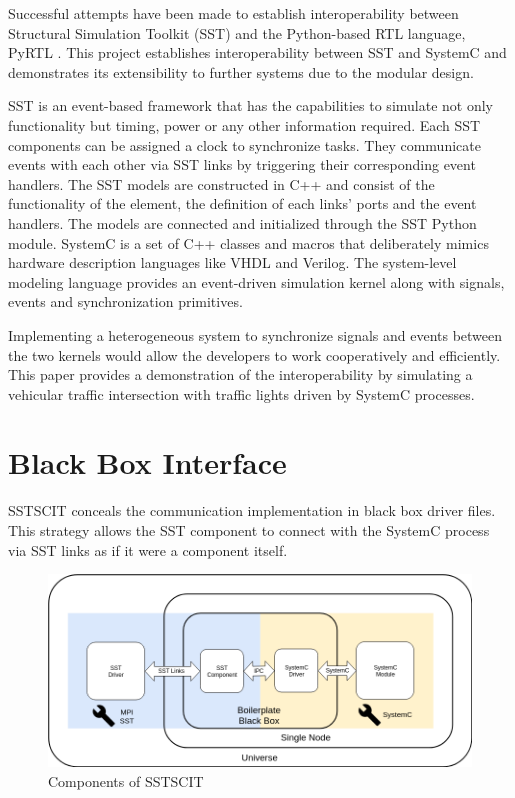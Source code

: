 \documentclass{article}
\begin{document}
  Successful attempts have been made to establish interoperability between Structural Simulation
  Toolkit (SST) and the Python-based RTL language, PyRTL \cite{pyrtl-sst}. This project establishes
  interoperability between SST and SystemC and demonstrates its extensibility to further systems due
  to the modular design.

  SST is an event-based framework that has the capabilities to simulate not only functionality but
  timing, power or any other information required. Each SST components can be assigned a clock to
  synchronize tasks. They communicate events with each other via SST links by triggering their
  corresponding event handlers. The SST models are constructed in C++ and consist of the
  functionality of the element, the definition of each links' ports and the event handlers. The
  models are connected and initialized through the SST Python module. SystemC is a set of C++
  classes and macros that deliberately mimics hardware description languages like VHDL and Verilog.
  The system-level modeling language provides an event-driven simulation kernel along with signals,
  events and synchronization primitives.

  Implementing a heterogeneous system to synchronize signals and events between the two kernels
  would allow the developers to work cooperatively and efficiently. This paper provides a
  demonstration of the interoperability by simulating a vehicular traffic intersection with traffic
  lights driven by SystemC processes.

  \section{Black Box Interface}
  SSTSCIT conceals the communication implementation in black box driver files. This strategy allows
  the SST component to connect with the SystemC process via SST links as if it were a component
  itself.

  \begin{figure}[!h]
    \centering
    \includegraphics[width=6.5in]{diagrams/comm.png}
    \caption{Components of SSTSCIT}
    \label{fig:comm}
  \end{figure}
\end{document}
